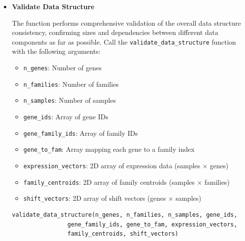\documentclass[11pt]{article}
\begin{document}
\begin{enumerate}
\begin{itemize}
	      	\item \textbf{Validate Data Structure}
	      	      
	      	      The function performs comprehensive validation of the overall data structure
	      	      consistency, confirming sizes and dependencies between different data
	      	      components as far as possible. Call the \texttt{validate\_data\_structure}
	      	      function with the following arguments:
	      	      
	      	      \begin{itemize}
	      	      	\item \texttt{n\_genes}: Number of genes
	      	      	      
	      	      	\item \texttt{n\_families}: Number of families
	      	      	      
	      	      	\item \texttt{n\_samples}: Number of samples
	      	      	      
	      	      	\item \texttt{gene\_ids}: Array of gene IDs
	      	      	      
	      	      	\item \texttt{gene\_family\_ids}: Array of family IDs
	      	      	      
	      	      	\item \texttt{gene\_to\_fam}: Array mapping each gene to a family index
	      	      	      
	      	      	\item \texttt{expression\_vectors}: 2D array of expression data (samples
	      	      	      × genes)
	      	      	      
	      	      	\item \texttt{family\_centroids}: 2D array of family centroids (samples
	      	      	      × families)
	      	      	      
	      	      	\item \texttt{shift\_vectors}: 2D array of shift vectors (genes ×
	      	      	      samples)
	      	      \end{itemize}
	      	      
	      	      \begin{lstlisting}[language=Python, caption={Python Validate Data Structure}]
validate_data_structure(n_genes, n_families, n_samples, gene_ids, 
                gene_family_ids, gene_to_fam, expression_vectors, 
                family_centroids, shift_vectors)
	      	      \end{lstlisting}
	      	      

\end{itemize}
\end{enumerate}
\end{document}
